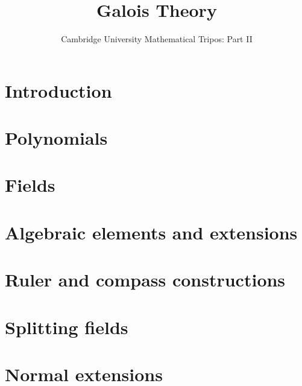 \documentclass{article}
\title{Galois Theory}
\author{Cambridge University Mathematical Tripos: Part II}
\begin{document}
\maketitle

\tableofcontentsnewpage{}

\section{Introduction}

\section{Polynomials}

\section{Fields}

\section{Algebraic elements and extensions}

\section{Ruler and compass constructions}

\section{Splitting fields}

\section{Normal extensions}

\end{document}
